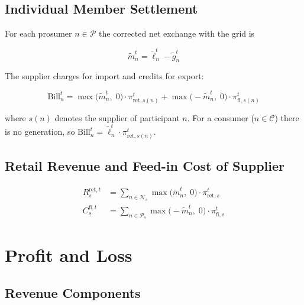 \documentclass[12pt,a4paper]{article}
\begin{document}
\subsection{Individual Member Settlement}

For each prosumer $n \in \mathcal{P}$ the corrected net exchange with the
grid is

\begin{equation}
\tilde{m}_{n}^{t} = \tilde{\ell}_{n}^{t} - \tilde{g}_{n}^{t}
\label{eq:prosumer_net}
\end{equation}

The supplier charges for import and credits for export:

\begin{equation}
\text{Bill}_{n}^{t}
  = \max\!\bigl(\tilde{m}_{n}^{t},\;0\bigr)
     \cdot \pi_{\mathrm{ret},s(n)}^{t}
   + \max\!\bigl(-\tilde{m}_{n}^{t},\;0\bigr)
     \cdot \pi_{\mathrm{fi},s(n)}^{t}
\label{eq:prosumer_bill}
\end{equation}

where $s(n)$ denotes the supplier of participant $n$.  For a consumer
($n \in \mathcal{C}$) there is no generation, so
$\text{Bill}_{n}^{t} = \tilde{\ell}_{n}^{t} \cdot \pi_{\mathrm{ret},s(n)}^{t}$.

\subsection{Retail Revenue and Feed-in Cost of Supplier}

\begin{align}
R_{s}^{\mathrm{ret},t}
  &= \sum_{n \in \mathcal{N}_{s}}
     \max\!\bigl(\tilde{m}_{n}^{t},\;0\bigr)
     \cdot \pi_{\mathrm{ret},s}^{t}
\label{eq:retail_revenue}\\
C_{s}^{\mathrm{fi},t}
  &= \sum_{n \in \mathcal{P}_{s}}
     \max\!\bigl(-\tilde{m}_{n}^{t},\;0\bigr)
     \cdot \pi_{\mathrm{fi},s}^{t}
\label{eq:feedin_cost}
\end{align}

\section{Profit and Loss}

\subsection{Revenue Components}
\end{document}
